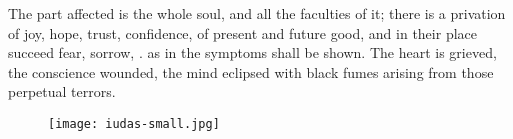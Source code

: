 {The part affected is the whole soul, and all the faculties of it;
there is a privation of joy, hope, trust, confidence, of present and
future good, and in their place succeed fear, sorrow, \etc{}. as in the
symptoms shall be shown. The heart is grieved, the conscience wounded,
the mind eclipsed with black fumes arising from those perpetual
terrors.

\cleartoleftpage{}
\begin{figure}[p!]
  \begingroup
  \centering
  \texttt{[image: iudas-small.jpg]}
  \label{fig:iudas}
\end{figure}
\clearpage{}
\thispagestyle{titleontop}
}

